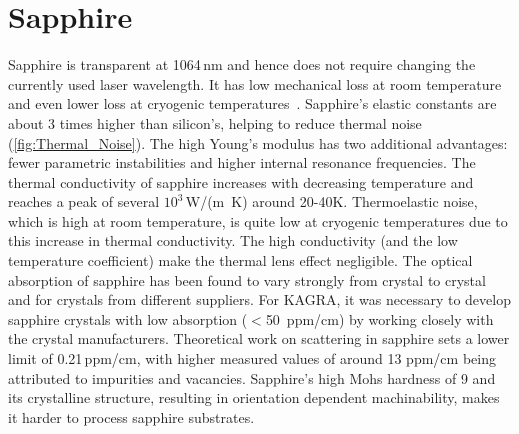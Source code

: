 \section{Sapphire}
Sapphire is transparent at 1064\,nm and hence does not require changing the currently used laser wavelength. It has low mechanical loss at room temperature~\cite{Rowan_2000a} and even lower loss at cryogenic temperatures~\cite{uchiyama1999mechanical}. 
Sapphire's elastic constants are about 3 times higher than silicon's, helping to reduce thermal noise (\ref{fig:Thermal_Noise}). The high Young's modulus has two additional advantages: fewer parametric instabilities and higher internal resonance frequencies. The thermal conductivity of sapphire increases with decreasing temperature and reaches a peak of several $10^3$\,W/(m \,K) around 20-40K. Thermoelastic noise, which is high at room temperature, is quite low at cryogenic temperatures due to this increase in thermal conductivity. The high conductivity (and the low temperature coefficient) make the thermal lens effect negligible. 
The optical absorption of sapphire has been found to vary strongly from crystal to crystal and for crystals from different suppliers. %
For \ac{KAGRA}, it was necessary to develop sapphire crystals with low absorption ($<$50~ppm/cm) by working closely with the crystal manufacturers. 
Theoretical work on scattering in sapphire sets a lower limit of 0.21\,ppm/cm, with higher measured values of around 13 ppm/cm being attributed to impurities and vacancies.
Sapphire's high Mohs hardness of 9 and its crystalline structure, resulting in orientation dependent machinability, makes it harder to process sapphire substrates. 
